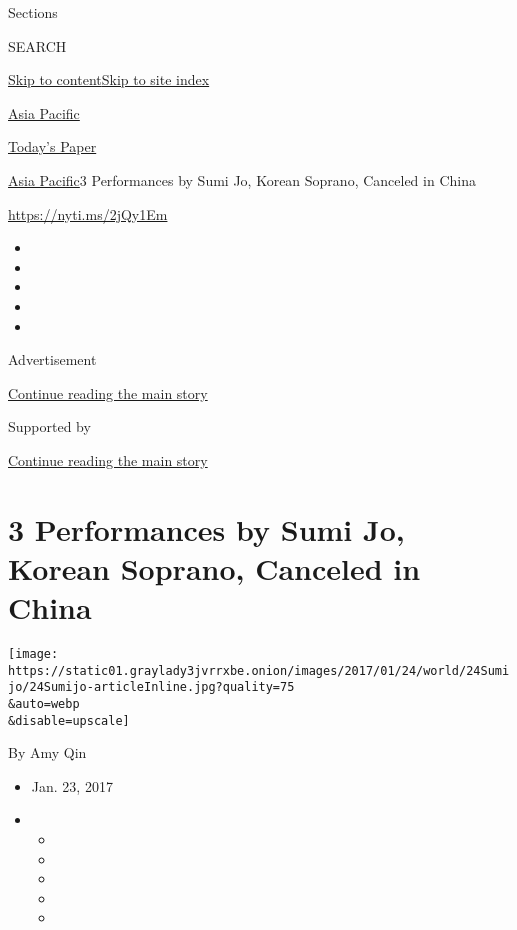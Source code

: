 Sections

SEARCH

\protect\hyperlink{site-content}{Skip to
content}\protect\hyperlink{site-index}{Skip to site index}

\href{https://www.nytimes3xbfgragh.onion/section/world/asia}{Asia
Pacific}

\href{https://myaccount.nytimes3xbfgragh.onion/auth/login?response_type=cookie\&client_id=vi}{}

\href{https://www.nytimes3xbfgragh.onion/section/todayspaper}{Today's
Paper}

\href{/section/world/asia}{Asia Pacific}\textbar{}3 Performances by Sumi
Jo, Korean Soprano, Canceled in China

\url{https://nyti.ms/2jQy1Em}

\begin{itemize}
\item
\item
\item
\item
\item
\end{itemize}

Advertisement

\protect\hyperlink{after-top}{Continue reading the main story}

Supported by

\protect\hyperlink{after-sponsor}{Continue reading the main story}

\hypertarget{3-performances-by-sumi-jo-korean-soprano-canceled-in-china}{%
\section{3 Performances by Sumi Jo, Korean Soprano, Canceled in
China}\label{3-performances-by-sumi-jo-korean-soprano-canceled-in-china}}

\texttt{[image: https://static01.graylady3jvrrxbe.onion/images/2017/01/24/world/24Sumijo/24Sumijo-articleInline.jpg?quality=75\\\&auto=webp\\\&disable=upscale]}

By Amy Qin

\begin{itemize}
\item
  Jan. 23, 2017
\item
  \begin{itemize}
  \item
  \item
  \item
  \item
  \item
  \end{itemize}
\end{itemize}

